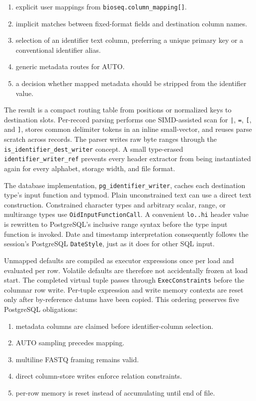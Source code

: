 \begin{enumerate}
    \item explicit user mappings from
    \texttt{bioseq.column\_mapping[]}.
    \item implicit matches between fixed-format fields and destination column
    names.
    \item selection of an identifier text column, preferring a unique primary
    key or a conventional identifier alias.
    \item generic metadata routes for AUTO.
    \item a decision whether mapped metadata should be stripped from the
    identifier value.
\end{enumerate}

The result is a compact routing table from positions or normalized keys to
destination slots.  Per-record parsing performs one SIMD-assisted scan for
\texttt{|}, \texttt{=}, \texttt{[}, and \texttt{]}, stores common delimiter
tokens in an inline small-vector, and reuses parse scratch across records.
The parser writes raw byte ranges through the
\texttt{is\_identifier\_dest\_writer} concept.  A small type-erased
\texttt{identifier\_writer\_ref} prevents every header extractor from being
instantiated again for every alphabet, storage width, and file format.

The database implementation, \texttt{pg\_identifier\_writer}, caches each
destination type's input function and typmod. Plain unconstrained text can use
a direct text construction. Constrained character types and arbitrary scalar,
range, or multirange types use
\texttt{Oid\allowbreak Input\allowbreak Function\allowbreak Call}. A convenient
\texttt{lo..hi} header value is rewritten to PostgreSQL's inclusive range
syntax before the type input function is invoked.  Date and timestamp
interpretation consequently follows the session's PostgreSQL
\texttt{DateStyle}, just as it does for other SQL input.

Unmapped defaults are compiled as executor expressions once per load and
evaluated per row.  Volatile defaults are therefore not accidentally frozen at
load start.  The completed virtual tuple passes through
\texttt{ExecConstraints} before the columnar row write.  Per-tuple expression
and write memory contexts are reset only after by-reference datums have been
copied. This ordering preserves five PostgreSQL obligations:

\begin{enumerate}
    \item metadata columns are claimed before identifier-column selection.
    \item AUTO sampling precedes mapping.
    \item multiline FASTQ framing remains valid.
    \item direct column-store writes enforce relation constraints.
    \item per-row memory is reset instead of accumulating until end of file.
\end{enumerate}

